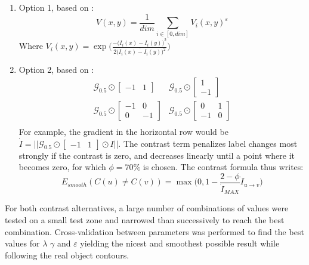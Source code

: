 \documentclass[10pt]{article}
\begin{document}
\begin{enumerate}
    \item Option 1, based on \cite{ouerghemmi_two-step_2017}: 
    \begin{equation}
        V(x,y)=\frac{1}{dim}\sum_{i\in[0,dim]}V_i(x,y)^\varepsilon
    \end{equation}
    Where $V_i(x,y)=\exp\Bigg(\frac{-\big(I_i(x)-I_i(y)\big)^2}{2\big(\overline{I_i(x)-I_i(y)}\big)^2}\Bigg)$
    \item Option 2, based on \cite{schindler_overview_2012}:
    \begin{equation}
        \begin{aligned}
            &\mathcal{G}_{0.5}\odot
            \begin{bmatrix}
            -1 &1
            \end{bmatrix}& \mathcal{G}_{0.5}\odot
            \begin{bmatrix}
            1 \\
            -1
            \end{bmatrix}&\\
            &\mathcal{G}_{0.5}\odot
            \begin{bmatrix}
            -1 & 0 \\
            0 &-1
            \end{bmatrix}&\mathcal{G}_{0.5}\odot
            \begin{bmatrix}
            0& 1 \\
            -1 &0
            \end{bmatrix}&\\
        \end{aligned}
    \end{equation}
    For example, the gradient in the horizontal row would be $\dot{I}=||\mathcal{G}_{0.5}\odot\begin{bmatrix}-1 &1\end{bmatrix}\odot I||$. The contrast term penalizes label changes most strongly if the contrast is zero, and decreases linearly until a point where it becomes zero, for which $\phi=70\%$ is chosen. The contrast formula thus writes:
    \begin{equation}
        E_{smooth}(C(u)\neq C(v))=\max\Big(0,1-\frac{2-\phi}{\dot{I}_{MAX}}\dot{I}_{u\rightarrow v}\Big)
    \end{equation}
\end{enumerate}
For both contrast alternatives, a large number of combinations of values were tested on a small test zone and narrowed than successively to reach the best combination. Cross-validation between parameters was performed to find the best values for $\lambda$ $\gamma$ and $\varepsilon$ yielding the nicest and smoothest possible result while following the real object contours.\\
\end{document}
